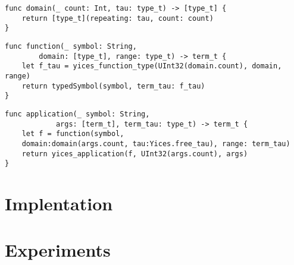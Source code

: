 \begin{lstlisting}[language=flea]
func domain(_ count: Int, tau: type_t) -> [type_t] {
	return [type_t](repeating: tau, count: count)
}
\end{lstlisting}

\begin{lstlisting}[language=flea]
func function(_ symbol: String, 
		domain: [type_t], range: type_t) -> term_t {
	let f_tau = yices_function_type(UInt32(domain.count), domain, range)
	return typedSymbol(symbol, term_tau: f_tau)
}
\end{lstlisting}

\begin{lstlisting}[language=flea]
func application(_ symbol: String, 
			args: [term_t], term_tau: type_t) -> term_t {
	let f = function(symbol, 
	domain:domain(args.count, tau:Yices.free_tau), range: term_tau)
	return yices_application(f, UInt32(args.count), args)
}
\end{lstlisting}





\section{Implentation}


\section{Experiments}